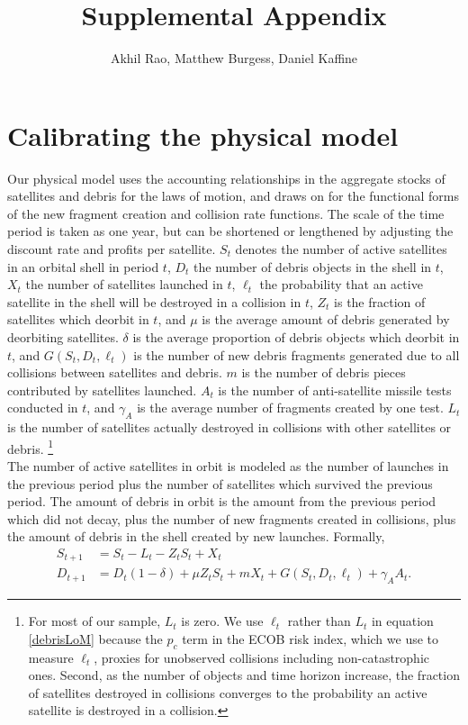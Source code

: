 \documentclass[12pt]{article}
\title{Supplemental Appendix}
\author{Akhil Rao, Matthew Burgess, Daniel Kaffine}
\begin{document}
	
	\maketitle

\section{Calibrating the physical model}	

Our physical model uses the accounting relationships in the aggregate stocks of satellites and debris for the laws of motion, and draws on \cite{bradleywein2009} for the functional forms of the new fragment creation and collision rate functions. The scale of the time period is taken as one year, but can be shortened or lengthened by adjusting the discount rate and profits per satellite. $S_t$ denotes the number of active satellites in an orbital shell in period $t$, $D_t$ the number of debris objects in the shell in $t$, $X_t$ the number of satellites launched in $t$, $\ell_t$ the probability that an active satellite in the shell will be destroyed in a collision in $t$, $Z_t$ is the fraction of satellites which deorbit in $t$, and $\mu$ is the average amount of debris generated by deorbiting satellites. $\delta$ is the average proportion of debris objects which deorbit in $t$, and $G(S_t,D_t,\ell_t)$ is the number of new debris fragments generated due to all collisions between satellites and debris. $m$ is the number of debris pieces contributed by satellites launched. $A_t$ is the number of anti-satellite missile tests conducted in $t$, and $\gamma_A$ is the average number of fragments created by one test. $L_t$ is the number of satellites actually destroyed in collisions with other satellites or debris. \footnote{For most of our sample, $L_t$ is zero. We use $\ell_t$ rather than $L_t$ in equation \ref{debrisLoM} because the $p_c$ term in the ECOB risk index, which we use to measure $\ell_t$, proxies for unobserved collisions including non-catastrophic ones. Second, as the number of objects and time horizon increase, the fraction of satellites destroyed in collisions converges to the probability an active satellite is destroyed in a collision.}\\

The number of active satellites in orbit is modeled as the number of launches in the previous period plus the number of satellites which survived the previous period. The amount of debris in orbit is the amount from the previous period which did not decay, plus the number of new fragments created in collisions, plus the amount of debris in the shell created by new launches. Formally,
\begin{align}
\label{satelliteLoM}
S_{t+1} &= S_t -L_t -Z_tS_t + X_t \\
\label{debrisLoM}
D_{t+1} &= D_t(1-\delta) + \mu Z_tS_t + mX_t + G(S_t,D_t,\ell_t) + \gamma_A A_t.
\end{align}
\end{document}
